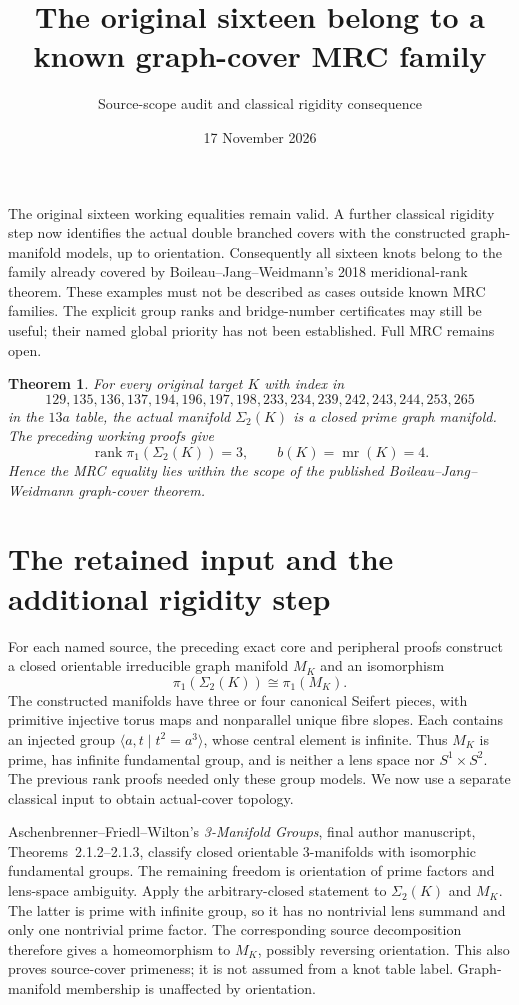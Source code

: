 \documentclass[11pt]{article}
\title{The original sixteen belong to a known graph-cover MRC family}
\author{Source-scope audit and classical rigidity consequence}
\date{17 November 2026}
\newtheorem{theorem}{Theorem}
\newcommand{\mr}{\operatorname{mr}}
\newcommand{\rank}{\operatorname{rank}}
\begin{document}
\maketitle

The original sixteen working equalities remain valid. A further classical
rigidity step now identifies the actual double branched covers with the
constructed graph-manifold models, up to orientation. Consequently all
sixteen knots belong to the family already covered by
Boileau--Jang--Weidmann's 2018 meridional-rank theorem. These examples
must not be described as cases outside known MRC families. The explicit
group ranks and bridge-number certificates may still be useful; their
named global priority has not been established. Full MRC remains open.

\begin{theorem}\label{thm:family}
For every original target $K$ with index in
\[
129,135,136,137,194,196,197,198,233,234,239,242,243,244,253,265
\]
in the $13a$ table, the actual manifold $\Sigma_2(K)$ is a closed prime
graph manifold. The preceding working proofs give
\[
 \rank\pi_1(\Sigma_2(K))=3,\qquad b(K)=\mr(K)=4.
\]
Hence the MRC equality lies within the scope of the published
Boileau--Jang--Weidmann graph-cover theorem.
\end{theorem}

\section{The retained input and the additional rigidity step}

For each named source, the preceding exact core and peripheral proofs
construct a closed orientable irreducible graph manifold $M_K$ and an
isomorphism
\[
 \pi_1(\Sigma_2(K))\cong\pi_1(M_K).
\]
The constructed manifolds have three or four canonical Seifert pieces,
with primitive injective torus maps and nonparallel unique fibre slopes.
Each contains an injected group $\langle a,t\mid t^2=a^3\rangle$, whose
central element is infinite. Thus $M_K$ is prime, has infinite fundamental
group, and is neither a lens space nor $S^1\times S^2$.
The previous rank proofs needed only these group models. We now use a
separate classical input to obtain actual-cover topology.

Aschenbrenner--Friedl--Wilton's \emph{3-Manifold Groups}, final author
manuscript, Theorems~2.1.2--2.1.3, classify closed orientable
3-manifolds with isomorphic fundamental groups. The remaining freedom
is orientation of prime factors and lens-space ambiguity. Apply the
arbitrary-closed statement to $\Sigma_2(K)$ and $M_K$. The latter is
prime with infinite group, so it has no nontrivial lens summand and only
one nontrivial prime factor. The corresponding source decomposition
therefore gives a homeomorphism to $M_K$, possibly reversing orientation.
This also proves source-cover primeness; it is not assumed from a knot
table label. Graph-manifold membership is unaffected by orientation.
\end{document}
